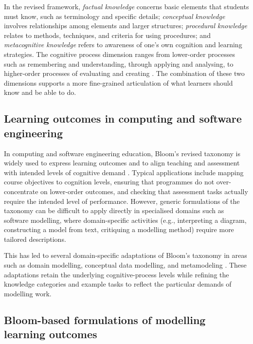 In the revised framework, \emph{factual knowledge} concerns basic elements that students must know, such as terminology and specific details; \emph{conceptual knowledge} involves relationships among elements and larger structures; \emph{procedural knowledge} relates to methods, techniques, and criteria for using procedures; and \emph{metacognitive knowledge} refers to awareness of one's own cognition and learning strategies. The cognitive process dimension ranges from lower-order processes such as remembering and understanding, through applying and analysing, to higher-order processes of evaluating and creating \cite{krathwohl2002revision}. The combination of these two dimensions supports a more fine-grained articulation of what learners should know and be able to do.

\subsection{Learning outcomes in computing and software engineering}
\label{subsec:bloom_computing_se}

In computing and software engineering education, Bloom’s revised taxonomy is widely used to express learning outcomes and to align teaching and assessment with intended levels of cognitive demand \cite{cc2020,krathwohl2002revision}. Typical applications include mapping course objectives to cognition levels, ensuring that programmes do not over-concentrate on lower-order outcomes, and checking that assessment tasks actually require the intended level of performance. However, generic formulations of the taxonomy can be difficult to apply directly in specialised domains such as software modelling, where domain-specific activities (e.g., interpreting a diagram, constructing a model from text, critiquing a modelling method) require more tailored descriptions.

This has led to several domain-specific adaptations of Bloom's taxonomy in areas such as domain modelling, conceptual data modelling, and metamodeling \cite{bogdanova2019camelot,bogdanova2017domain,bork2019framework}. These adaptations retain the underlying cognitive-process levels while refining the knowledge categories and example tasks to reflect the particular demands of modelling work.

\subsection{Bloom-based formulations of modelling learning outcomes}
\label{subsec:bloom_modelling}

